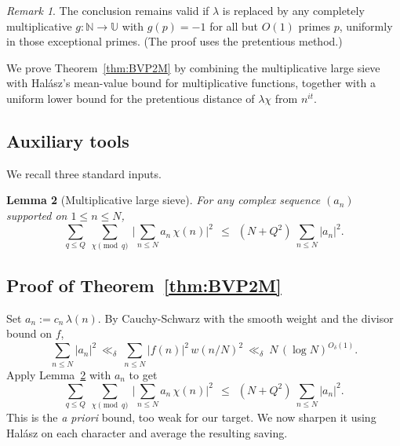 \documentclass[11pt]{article}
\newtheorem{lemma}{Lemma}[part]
\theoremstyle{definition}
\theoremstyle{remark}
\newtheorem{remark}[lemma]{Remark}
\numberwithin{equation}{part}
\begin{document}
\begin{remark}
	The conclusion remains valid if $\lambda$ is replaced by any completely multiplicative $g:\mathbb N\to\mathbb U$ with $g(p)=-1$ for all but $O(1)$ primes $p$, uniformly in those exceptional primes. (The proof uses the pretentious method.)
\end{remark}

We prove Theorem~\ref{thm:BVP2M} by combining the multiplicative large sieve with Halász's mean-value bound for multiplicative functions, together with a uniform lower bound for the pretentious distance of $\lambda\chi$ from $n^{it}$.

\subsection*{Auxiliary tools}
We recall three standard inputs.

\begin{lemma}[Multiplicative large sieve]\label{lem:mls}
	For any complex sequence $(a_n)$ supported on $1\le n\le N$,
	\[
		\sum_{q\le Q}\ \sum_{\chi\!\!\!\pmod q}\ \Big|\sum_{n\le N} a_n\,\chi(n)\Big|^2
		\ \ \le\ \ (N+Q^2)\ \sum_{n\le N} |a_n|^2.
	\]
\end{lemma}

\subsection*{Proof of Theorem~\ref{thm:BVP2M}}
Set $a_n := c_n\,\lambda(n)$. By Cauchy-Schwarz with the smooth weight and the divisor bound on $f$,
\[
	\sum_{n\le N}|a_n|^2\ \ll_{\delta}\ \sum_{n\le N} |f(n)|^2\,w(n/N)^2\ \ll_\delta\ N\,(\log N)^{O_\delta(1)}.
\]
Apply Lemma~\ref{lem:mls} with $a_n$ to get
\begin{equation}\label{eq:LS-upper}
	\sum_{q\le Q}\ \sum_{\chi\!\!\!\pmod q}\ \Big|\sum_{n\le N} a_n\,\chi(n)\Big|^2
	\ \ \le\ \ (N+Q^2)\ \sum_{n\le N} |a_n|^2.
\end{equation}
This is the \emph{a priori} bound, too weak for our target. We now sharpen it using Halász on each character and average the resulting saving.
\end{document}
